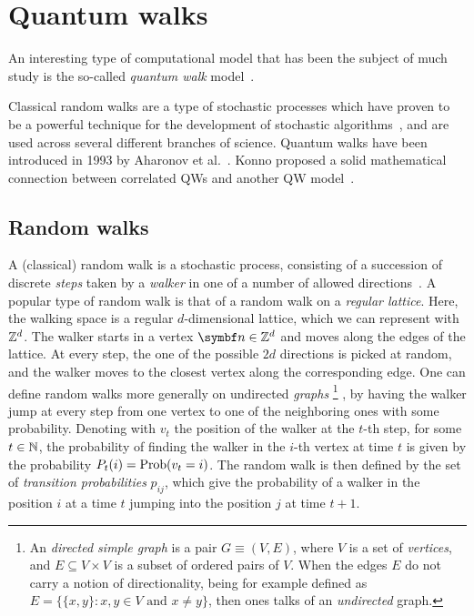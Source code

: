 \section{Quantum walks}
\label{sec:intro:QWs}

An interesting type of computational model that has been the subject of much study is the so-called \textit{quantum walk} model~\cite{aharonov2000quantum,kempe2003quantum,venegasandraca2012quantum,portugal2013quantum}.

Classical random walks are a type of stochastic processes which have proven to be a powerful technique for the development of stochastic algorithms~\cite{motwani1995randomized,schoning1999probabilistic}, and are used across several different branches of science.
Quantum walks have been introduced in 1993 by Aharonov et al.~\cite{aharonov1993quantum}.
Konno proposed a solid mathematical connection between correlated \acp{QW} and another QW model~\cite{konno2003limit}.

\subsection{Random walks}
A (classical) random walk is a stochastic process, consisting of a succession of discrete \textit{steps} taken by a \textit{walker} in one of a number of allowed directions~\cite{lovasz1993random}.
A popular type of random walk is that of a random walk on a \textit{regular lattice}. Here, the walking space is a regular $d$-dimensional lattice, which we can represent with $\mathbb{Z}^d$. The walker starts in a vertex $\bs n\in\ZZ^d$ and moves along the edges of the lattice.
At every step, the one of the possible $2d$ directions is picked at random, and the walker moves to the closest vertex along the corresponding edge.
One can define random walks more generally on undirected \textit{graphs}
\footnote{An \textit{directed simple graph} is a pair $G\equiv (V,E)$, where $V$ is a set of \textit{vertices}, and $E\subseteq V\times V$ is a subset of ordered pairs of $V$. When the edges $E$ do not carry a notion of directionality, being for example defined as $E=\{\{x,y\} : x,y\in V\text{ and }x\neq y\}$, then ones talks of an \textit{undirected} graph.}
, by having the walker jump at every step from one vertex to one of the neighboring ones with some probability.
Denoting with $v_t$ the position of the walker at the $t$-th step, for some $t\in\mathbb{N}$, the probability of finding the walker in the $i$-th vertex at time $t$ is given by the probability
$P_t(i)=\operatorname*{Prob}(v_t=i)$. The random walk is then defined by the set of \textit{transition probabilities} $p_{ij}$, which give the probability of a walker in the position $i$ at a time $t$ jumping into the position $j$ at time $t+1$.

